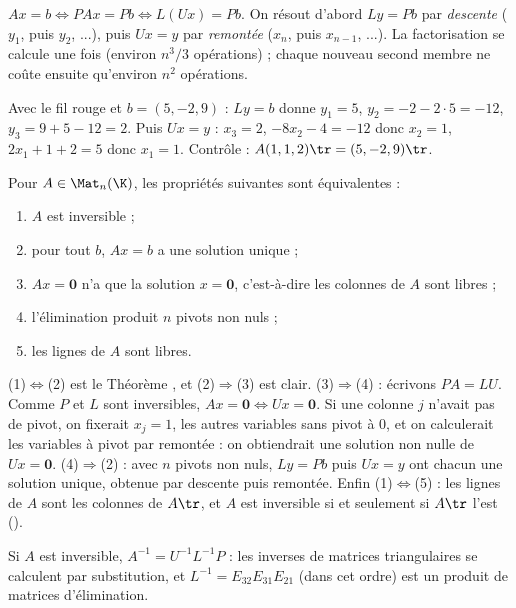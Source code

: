 \begin{methode}[Résoudre $Ax=b$ avec $PA=LU$]
$Ax=b\iff PAx=Pb\iff L(Ux)=Pb$. On résout d'abord $Ly=Pb$ par \emph{descente} ($y_1$, puis $y_2$, ...), puis $Ux=y$ par \emph{remontée} ($x_n$, puis $x_{n-1}$, ...). La factorisation se calcule une fois (environ $n^3/3$ opérations) ; chaque nouveau second membre ne coûte ensuite qu'environ $n^2$ opérations.
\end{methode}
\begin{exemple}
Avec le fil rouge et $b=(5,-2,9)$ : $Ly=b$ donne $y_1=5$, $y_2=-2-2\cdot5=-12$, $y_3=9+5-12=2$. Puis $Ux=y$ : $x_3=2$, $-8x_2-4=-12$ donc $x_2=1$, $2x_1+1+2=5$ donc $x_1=1$. Contrôle : $A(1,1,2)\tr=(5,-2,9)\tr$.
\end{exemple}
\begin{theoreme}\label{thm-caract-inv}
Pour $A\in\Mat_n(\K)$, les propriétés suivantes sont équivalentes :
\begin{enumerate}
\item $A$ est inversible ;
\item pour tout $b$, $Ax=b$ a une solution unique ;
\item $Ax=\mathbf 0$ n'a que la solution $x=\mathbf 0$, c'est-à-dire les colonnes de $A$ sont libres ;
\item l'élimination produit $n$ pivots non nuls ;
\item les lignes de $A$ sont libres.
\end{enumerate}
\end{theoreme}
\begin{preuve}
(1)$\iff$(2) est le Théorème , et (2)$\Rightarrow$(3) est clair. (3)$\Rightarrow$(4) : écrivons $PA=LU$. Comme $P$ et $L$ sont inversibles, $Ax=\mathbf 0\iff Ux=\mathbf 0$. Si une colonne $j$ n'avait pas de pivot, on fixerait $x_j=1$, les autres variables sans pivot à $0$, et on calculerait les variables à pivot par remontée : on obtiendrait une solution non nulle de $Ux=\mathbf 0$. (4)$\Rightarrow$(2) : avec $n$ pivots non nuls, $Ly=Pb$ puis $Ux=y$ ont chacun une solution unique, obtenue par descente puis remontée. Enfin (1)$\iff$(5) : les lignes de $A$ sont les colonnes de $A\tr$, et $A$ est inversible si et seulement si $A\tr$ l'est ().
\end{preuve}
\begin{remarque}
Si $A$ est inversible, $A^{-1}=U^{-1}L^{-1}P$ : les inverses de matrices triangulaires se calculent par substitution, et $L^{-1}=E_{32}E_{31}E_{21}$ (dans cet ordre) est un produit de matrices d'élimination.
\end{remarque}

